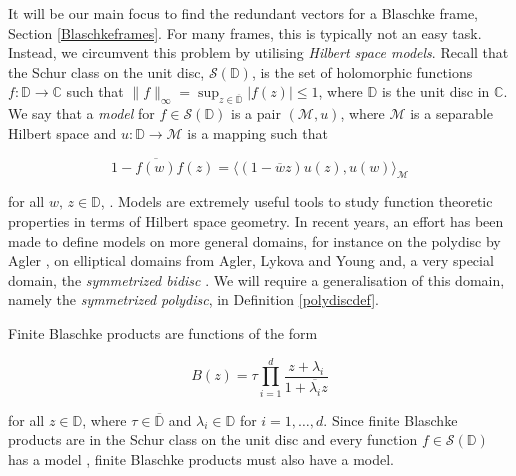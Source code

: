 \documentclass[10pt, reqno]{amsart}
\theoremstyle{definition}
\numberwithin{equation}{section}
\begin{document}
It will be our main focus to find the redundant vectors for a Blaschke frame, Section \ref{Blaschkeframes}. For many frames, this is typically not an easy task. Instead, we circumvent this problem by utilising {\it{Hilbert space models}}. Recall that the Schur class on the unit disc, $\mathcal{S}(\mathbb{D})$, is the set of holomorphic functions $f:\mathbb{D}\rightarrow \mathbb{C}$ such that $\|f\|_{\infty} = \sup_{z\in\overline{\mathbb{D}}}|f(z)|\leq 1$, where $\mathbb{D}$ is the unit disc in $\mathbb{C}$. We say that a {\it{model}} for $f\in\mathcal{S}(\mathbb{D})$ is a pair $(\mathcal{M},u)$, where $\mathcal{M}$ is a separable Hilbert space and $u:\mathbb{D}\rightarrow \mathcal{M}$ is a mapping such that

$$1-\overline{f(w)}f(z) = \Big\langle (1-\overline{w}z)u(z),u(w)\Big\rangle_{\mathcal{M}}$$ 

\noindent for all $w,\,z\in\mathbb{D}$, \cite[Definition 2.7]{AMYOperatorbook}. Models are extremely useful tools to study function theoretic properties in terms of Hilbert space geometry. In recent years, an effort has been made to define models on more general domains, for instance on the polydisc by Agler \cite{Agler}, on elliptical domains from Agler, Lykova and Young \cite{AglerLykovaYoung} and, a very special domain, the {\it{symmetrized bidisc}} \cite{symmeterizedbidisc}. We will require a generalisation of this domain, namely the {\it{symmetrized polydisc}}, in Definition \ref{polydiscdef}. 

Finite Blaschke products are functions of the form

\begin{equation}\label{fbpform}
B(z) = \tau\prod_{i=1}^{d}\dfrac{z+\lambda_{i}}{1+\overline{\lambda_{i}}z}
\end{equation}

\noindent for all $z\in\mathbb{D}$, where $\tau\in\overline{\mathbb{D}}$ and $\lambda_{i}\in\mathbb{D}$ for $i=1,\hdots,d$. Since finite Blaschke products are in the Schur class on the unit disc and every function $f\in\mathcal{S}(\mathbb{D})$ has a model \cite[Theorem 2.9]{AMYOperatorbook}, finite Blaschke products must also have a model.
\end{document}
